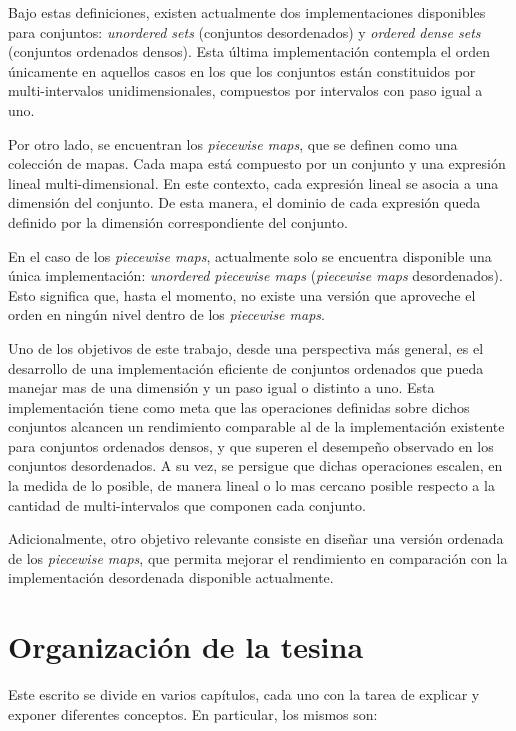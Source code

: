 Bajo estas definiciones, existen actualmente dos implementaciones disponibles para conjuntos: \textit{unordered sets} (conjuntos desordenados) y \textit{ordered dense sets} (conjuntos ordenados densos). Esta última implementación contempla el orden únicamente en aquellos casos en los que los conjuntos están constituidos por multi-intervalos unidimensionales, compuestos por intervalos con paso igual a uno.

Por otro lado, se encuentran los \textit{piecewise maps}, que se definen como una colección de mapas. Cada mapa está compuesto por un conjunto y una expresión lineal multi-dimensional. En este contexto, cada expresión lineal se asocia a una dimensión del conjunto. De esta manera, el dominio de cada expresión queda definido por la dimensión correspondiente del conjunto.

En el caso de los \textit{piecewise maps}, actualmente solo se encuentra disponible una única implementación: \textit{unordered piecewise maps} (\textit{piecewise maps} desordenados). Esto significa que, hasta el momento, no existe una versión que aproveche el orden en ningún nivel dentro de los \textit{piecewise maps}.

Uno de los objetivos de este trabajo, desde una perspectiva más general, es el desarrollo de una implementación eficiente de conjuntos ordenados que pueda manejar mas de una dimensión y un paso igual o distinto a uno. Esta implementación tiene como meta que las operaciones definidas sobre dichos conjuntos alcancen un rendimiento comparable al de la implementación existente para conjuntos ordenados densos, y que superen el desempeño observado en los conjuntos desordenados. A su vez, se persigue que dichas operaciones escalen, en la medida de lo posible, de manera lineal o lo mas cercano posible respecto a la cantidad de multi-intervalos que componen cada conjunto.

Adicionalmente, otro objetivo relevante consiste en diseñar una versión ordenada de los \textit{piecewise maps}, que permita mejorar el rendimiento en comparación con la implementación desordenada disponible actualmente.

\section{Organización de la tesina}

Este escrito se divide en varios capítulos, cada uno con la tarea de explicar y exponer diferentes conceptos. En particular, los mismos son:

